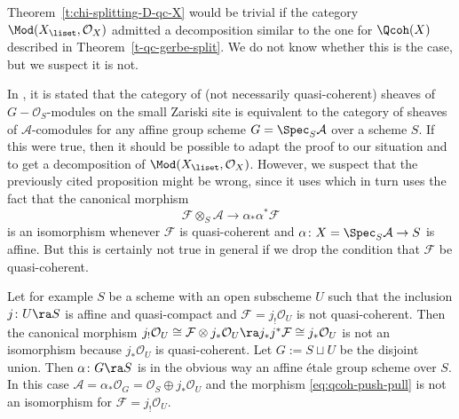\begin{remark}
\label{rem:decomposition-O-modules}
Theorem~\ref{t:chi-splitting-D-qc-X} would be trivial if
the category $\Mod(X_\liset, \mathcal{O}_X)$ admitted a decomposition
similar 
to the one for $\Qcoh(X)$ described in Theorem~\ref{t-qc-gerbe-split}.
We do not know whether this is the case,
but we suspect it is not.

In \cite[Exposé 1, Proposition~4.7.2]{sga-3-1-2011}, it is stated
that the category of (not necessarily quasi-coherent) sheaves of $G-\mathcal{O}_S$-modules
on the small Zariski site
is equivalent to the category of sheaves of $\mathcal{A}$-comodules for any affine group scheme $G = \Spec_S \mathcal{A}$ over
a scheme $S$.
If this were true, then it should be possible to adapt the proof
to our situation and to get a decomposition of $\Mod(X_\liset, \mathcal{O}_X)$.
However, we suspect that the previously cited proposition might be wrong, 
since it uses \cite[Exposé 1, Proposition~4.6.4]{sga-3-1-2011}
which in turn uses the fact that the canonical morphism
\begin{equation}
  \label{eq:qcoh-push-pull}
  \mathcal{F}\otimes_S \mathcal{A} \to \alpha_\ast\alpha^\ast\mathcal{F}
\end{equation}
is an isomorphism whenever $\mathcal{F}$ is quasi-coherent and
$\alpha\colon X = \Spec_S \mathcal{A} \to S$ is affine.
But this is certainly not true in general if we drop the condition that $\mathcal{F}$ be quasi-coherent. 

Let for example $S$ be a scheme with an open subscheme $U$
such that the inclusion $j \colon U \ra S$ 
is affine and quasi-compact
and $\mathcal{F}=j_! \mathcal{O}_U$ is not
quasi-coherent. Then the canonical morphism $j_!
\mathcal{O}_U \cong \mathcal{F} \otimes j_*\mathcal{O}_U \ra
j_*j^* \mathcal{F} \cong j_*\mathcal{O}_U$ is not an
isomorphism because $j_*\mathcal{O}_U$ is quasi-coherent.
Let $G:=S \sqcup U$ be the disjoint union. Then
$\alpha \colon G \ra S$ is in the obvious way an
affine \'etale group
scheme over $S$. In this case 
$\mathcal{A}=\alpha_*\mathcal{O}_G=
\mathcal{O}_S \oplus
j_*\mathcal{O}_U$ and the morphism
\eqref{eq:qcoh-push-pull} is not an isomorphism for 
$\mathcal{F}=j_! \mathcal{O}_U$.
\end{remark}

